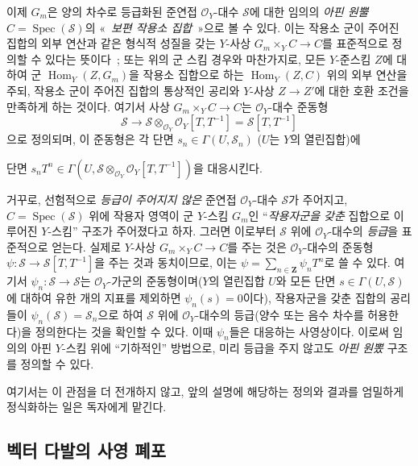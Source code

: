 \begin{remark}[8.3.9]
이제 $G_m$은 양의 차수로 등급화된 준연접 $\mathcal{O}_Y$-대수
$\mathcal{S}$에 대한 임의의 \emph{아핀 원뿔}
$C=\operatorname{Spec}(\mathcal{S})$의 «~\emph{보편 작용소 집합}~»으로
볼 수 있다. 이는 작용소 군이 주어진 집합의 외부 연산과 같은 형식적
성질을 갖는 $Y$-사상 $G_m\times_YC\to C$를 표준적으로 정의할 수
있다는 뜻이다~; 또는 위의 군 스킴 경우와 마찬가지로, 모든
$Y$-준스킴 $Z$에 대하여 군 $\operatorname{Hom}_Y(Z,G_m)$을 작용소
집합으로 하는 $\operatorname{Hom}_Y(Z,C)$ 위의 외부 연산을 주되,
작용소 군이 주어진 집합의 통상적인 공리와 $Y$-사상 $Z\to Z'$에 대한
호환 조건을 만족하게 하는 것이다. 여기서 사상 $G_m\times_YC\to C$는
$\mathcal{O}_Y$-대수 준동형
\[
  \mathcal{S}\to
  \mathcal{S}\otimes_{\mathcal{O}_Y}\mathcal{O}_Y[T,T^{-1}]
  =\mathcal{S}[T,T^{-1}]
\]
으로 정의되며, 이 준동형은 각 단면
$s_n\in\Gamma(U,\mathcal{S}_n)$ ($U$는 $Y$의 열린집합)에

단면
$s_nT^n\in\Gamma(U,\mathcal{S}\otimes_{\mathcal{O}_Y}
\mathcal{O}_Y[T,T^{-1}])$을 대응시킨다.

거꾸로, 선험적으로 \emph{등급이 주어지지 않은} 준연접
$\mathcal{O}_Y$-대수 $\mathcal{S}$가 주어지고,
$C=\operatorname{Spec}(\mathcal{S})$ 위에 작용자 영역이 군
$Y$-스킴 $G_m$인 ``\emph{작용자군을 갖춘} 집합으로 이루어진
$Y$-스킴'' 구조가 주어졌다고 하자. 그러면 이로부터
$\mathcal{S}$ 위에 $\mathcal{O}_Y$-대수의 \emph{등급}을 표준적으로
얻는다. 실제로 $Y$-사상 $G_m\times_YC\to C$를 주는 것은
$\mathcal{O}_Y$-대수의 준동형
$\psi:\mathcal{S}\to\mathcal{S}[T,T^{-1}]$을 주는 것과 동치이므로,
이는
$\psi=\sum_{n\in\mathbf{Z}}\psi_nT^n$로 쓸 수 있다. 여기서
$\psi_n:\mathcal{S}\to\mathcal{S}$는 $\mathcal{O}_Y$-가군의
준동형이며($Y$의 열린집합 $U$와 모든 단면
$s\in\Gamma(U,\mathcal{S})$에 대하여 유한 개의 지표를 제외하면
$\psi_n(s)=0$이다), 작용자군을 갖춘 집합의 공리들이
$\psi_n(\mathcal{S})=\mathcal{S}_n$으로 하여
$\mathcal{S}$ 위에 $\mathcal{O}_Y$-대수의 등급(양수 또는 음수
차수를 허용한다)을 정의한다는 것을 확인할 수 있다. 이때
$\psi_n$들은 대응하는 사영상이다. 이로써 임의의 아핀
$Y$-스킴 위에 ``기하적인'' 방법으로, 미리 등급을 주지 않고도
\emph{아핀 원뽔} 구조를 정의할 수 있다.

여기서는 이 관점을 더 전개하지 않고, 앞의 설명에 해당하는
정의와 결과를 엄밀하게 정식화하는 일은 독자에게 맡긴다.
\end{remark}

\subsection{벡터 다발의 사영 폐포}
\label{subsection:II.8.4-ko}


